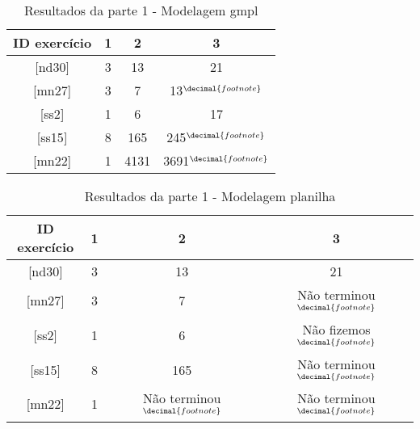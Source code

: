 \documentclass[11pt,letterpaper]{article}
\begin{document}
\begin{table}[h!]
  \begin{centering}
    \begin{tabular}{|c|c|c|c|}
      \hline 
      ID exercício & 1 & 2 & 3\tabularnewline
      \hline 
      \hline 
      {[}nd30{]}  & 3 & 13  & 21 \tabularnewline
      \hline 
      {[}mn27{]} & 3 & 7 & 13$^{\decimal{footnote}}$\addtocounter{footnote}{1} \tabularnewline
      \hline 
      {[}ss2{]} & 1 & 6  & 17 \tabularnewline
      \hline 
      {[}ss15{]} & 8 & 165  & 245$^{\decimal{footnote}}$\addtocounter{footnote}{1}  \tabularnewline
      \hline 
      {[}mn22{]} & 1 & 4131  & 3691$^{\decimal{footnote}}$\addtocounter{footnote}{1} \tabularnewline
      \hline 
    \end{tabular}
    \par\end{centering}
  \caption{Resultados da parte 1 - Modelagem gmpl}
\end{table}

\begin{table}[h!]
  \begin{centering}
    \begin{tabular}{|c|c|c|c|}
      \hline 
      ID exercício & 1 & 2 & 3\tabularnewline
      \hline 
      \hline 
      {[}nd30{]}  & 3 & 13  & 21 \tabularnewline
      \hline 
      {[}mn27{]} & 3 & 7 & Não terminou$^{\decimal{footnote}}$\addtocounter{footnote}{1} \tabularnewline
      \hline 
      {[}ss2{]} & 1 & 6  & Não fizemos$^{\decimal{footnote}}$\addtocounter{footnote}{-1} \tabularnewline
      \hline 
      {[}ss15{]} & 8 & 165  & Não terminou$^{\decimal{footnote}}$  \tabularnewline
      \hline 
      {[}mn22{]} & 1 & Não terminou$^{\decimal{footnote}}$  & Não terminou$^{\decimal{footnote}}$ \tabularnewline
      \hline 
    \end{tabular}
    \par\end{centering}
  \caption{Resultados da parte 1 - Modelagem planilha}
\end{table}
\end{document}
